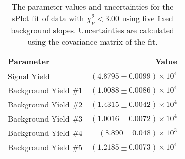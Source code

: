 
\begin{table}[ht]
    \begin{center}
        \begin{tabular}{lr}\toprule
            Parameter & Value \\\midrule
            Signal Yield & $(4.8795 \pm 0.0099) \times 10^{4}$ \\
            Background Yield $\#1$ & $(1.0088 \pm 0.0086) \times 10^{4}$ \\
            Background Yield $\#2$ & $(1.4315 \pm 0.0042) \times 10^{4}$ \\
            Background Yield $\#3$ & $(1.0016 \pm 0.0072) \times 10^{4}$ \\
            Background Yield $\#4$ & $(8.890 \pm 0.048) \times 10^{3}$ \\
            Background Yield $\#5$ & $(1.2185 \pm 0.0073) \times 10^{4}$ \\\bottomrule
        \end{tabular}
        \caption{The parameter values and uncertainties for the sPlot fit of data with $\chi^2_\nu < 3.00$ using five fixed background slopes. Uncertainties are calculated using the covariance matrix of the fit.}\label{tab:splot-fit-results-chisqdof-3.00-fixed-5}
    \end{center}
\end{table}
